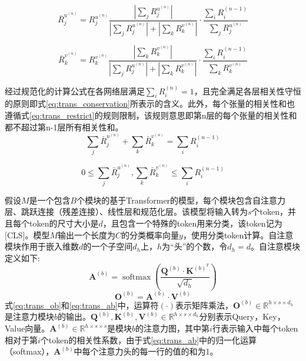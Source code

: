 \begin{equation}
	\bar{R}_{j}^{u^{(n)}}=R_{j}^{u^{(n)}} \frac{\left|\sum_{j} R_{j}^{u^{(n)}}\right|}{\left|\sum_{j} R_{j}^{u^{(n)}}\right|+\left|\sum_{k} R_{k}^{v^{(n)}}\right|} \cdot \frac{\sum_{i} R_{i}^{(n-1)}}{\sum_{j} R_{j}^{u^{(n)}}}
	\label{eq:trans_Ru}
\end{equation}

\begin{equation}
	\bar{R}_{k}^{v^{(n)}}=R_{k}^{v^{(n)}} \frac{\left|\sum_{k} R_{k}^{v^{(n)}}\right|}{\left|\sum_{j} R_{j}^{u^{(n)}}\right|+\left|\sum_{k} R_{k}^{v^{(n)}}\right|} \cdot \frac{\sum_{i} R_{i}^{(n-1)}}{\sum_{k} R_{k}^{v^{(n)}}}
	\label{eq:trans_Rv}
\end{equation}

经过规范化的计算公式在各网络层满足$\sum_{i} R_{i}^{(n)}=1$，且完全满足各层相关性守恒的原则即式\ref{eq:trans_conservation}所表示的含义。此外，每个张量的相关性和也遵循式\ref{eq:trans_restrict}的规则限制，该规则意思即第n层的每个张量的相关性和都不超过第n-1层所有相关性和。
\begin{equation}
	\sum_{j} \bar{R}_{j}^{u^{(n)}}+ \sum_{k} \bar{R}_{k}^{v^{(n)}} =\sum_{i} R_{i}^{(n-1)}
	\label{eq:trans_conservation}
\end{equation}

\begin{equation}
	0 \leq \sum_{j} \bar{R}_{j}^{u^{(n)}}, \sum_{k} \bar{R}_{k}^{v^{(n)}} \leq \sum_{i} R_{i}^{(n-1)}
	\label{eq:trans_restrict}
\end{equation}

假设$M$是一个包含$B$个模块的基于Transformer的模型，每个模块包含自注意力层、跳跃连接（残差连接）、线性层和规范化层。该模型将输入转为$s$个token，并且每个token的尺寸大小是$d$，且包含一个特殊的token用来分类，该token记为[CLS]。模型$M$输出一个长度为$C$的分类概率向量$y$，使用分类token计算。自注意模块作用于嵌入维数$d$的一个子空间$d_h$上，$h$为“头”的个数，令$d_h=d$。自注意模块定义如下:
\begin{equation}
	\mathbf{A}^{(b)}=\operatorname{softmax}\left(\frac{\mathbf{Q}^{(b)} \cdot \mathbf{K}^{(b)^{T}}}{\sqrt{d_{h}}}\right) 
	\label{eq:trans_ab}
\end{equation}
\begin{equation}
	\mathbf{O}^{(b)}=\mathbf{A}^{(b)} \cdot \mathbf{V}^{(b)}
	\label{eq:trans_ob}
\end{equation}
式\ref{eq:trans_ob}和\ref{eq:trans_ab}中，运算符$(\cdot)$表示矩阵乘法，$\mathbf{O}^{(b)} \in \mathbb{R}^{h\times s \times d_h}$是注意力模块$b$的输出。$\mathbf{Q}^{(b)},\mathbf{K}^{(b)},\mathbf{V}^{(b)} \in \mathbb{R}^{h\times s \times d_h}$分别表示Query，Key，Value向量。$\mathbf{A}^{(b)} \in \mathbb{R}^{h\times s \times s}$是模块$b$的注意力图，其中第$i$行表示输入中每个token相对于第$i$个token的相关性系数，由于式\ref{eq:trans_ab}中的归一化运算（softmax），$\mathbf{A}^{(b)}$中每个注意力头的每一行的值的和为1。

